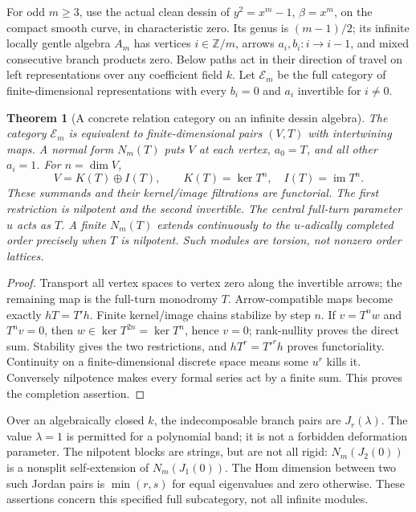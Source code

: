 \documentclass[11pt]{article}
\newtheorem{theorem}{Theorem}[section]
\theoremstyle{definition}\newtheorem{definition}[theorem]{Definition}
\theoremstyle{remark}\newtheorem{remark}[theorem]{Remark}
\begin{document}
For odd $m\geq3$, use the actual clean dessin of
$y^2=x^m-1$, $\beta=x^m$, on the compact smooth curve, in
characteristic zero. Its genus is $(m-1)/2$; its infinite locally gentle
algebra $A_m$ has vertices $i\in\mathbb Z/m$, arrows
$a_i,b_i:i\to i-1$, and mixed consecutive branch products zero.
Below paths act in their direction of travel on left representations over
any coefficient field $k$. Let $\mathcal E_m$ be the full category of
finite-dimensional representations with every $b_i=0$ and $a_i$ invertible
for $i\ne0$.

\begin{theorem}[A concrete relation category on an infinite dessin algebra]
\label{rel:branch}
The category $\mathcal E_m$ is equivalent to finite-dimensional pairs
$(V,T)$ with intertwining maps. A normal form $N_m(T)$ puts $V$ at each
vertex, $a_0=T$, and all other $a_i=1$. For $n=\dim V$,
\[
 V=K(T)\oplus I(T),\qquad K(T)=\ker T^n,\quad I(T)=\operatorname{im}T^n.
\]
These summands and their kernel/image filtrations are functorial. The first
restriction is nilpotent and the second invertible. The central full-turn
parameter $u$ acts as $T$. A finite $N_m(T)$ extends continuously to the
$u$-adically completed order precisely when $T$ is nilpotent. Such modules
are torsion, not nonzero order lattices.
\end{theorem}
\begin{proof}
Transport all vertex spaces to vertex zero along the invertible arrows;
the remaining map is the full-turn monodromy $T$. Arrow-compatible maps
become exactly $hT=T'h$. Finite kernel/image chains stabilize by step $n$.
If $v=T^nw$ and $T^nv=0$, then $w\in\ker T^{2n}=\ker T^n$, hence $v=0$;
rank-nullity proves the direct sum. Stability gives the two restrictions,
and $hT^r=T'^rh$ proves functoriality. Continuity on a finite-dimensional
discrete space means some $u^r$ kills it. Conversely nilpotence makes every
formal series act by a finite sum. This proves the completion assertion.
\end{proof}

Over an algebraically closed $k$, the indecomposable branch pairs are
$J_r(\lambda)$. The value $\lambda=1$ is permitted for a polynomial band;
it is not a forbidden deformation parameter. The nilpotent blocks are
strings, but are not all rigid: $N_m(J_2(0))$ is a nonsplit self-extension
of $N_m(J_1(0))$. The Hom dimension between two such Jordan pairs is
$\min(r,s)$ for equal eigenvalues and zero otherwise. These assertions
concern this specified full subcategory, not all infinite modules.
\end{document}
